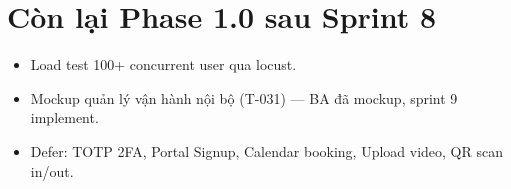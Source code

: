 \section{Còn lại Phase 1.0 sau Sprint 8}

\begin{itemize}[leftmargin=*]
    \item Load test 100+ concurrent user qua locust.
    \item Mockup quản lý vận hành nội bộ (T-031) --- BA đã mockup, sprint 9 implement.
    \item Defer: TOTP 2FA, Portal Signup, Calendar booking, Upload video, QR scan in/out.
\end{itemize}
